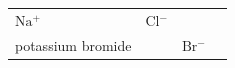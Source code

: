 \begin{enumerate}[noitemsep, label=\textbf{\arabic*}. ]
{{\begin{center}
\begin{xtabular}[t]{|l|l|l|l|}
        \begin{math}\mathrm{Na}{}^{+}\end{math} &
    
    
        \begin{math}\mathrm{Cl}{}^{-}\end{math} &
    
    
     \tabularnewline{}
    
    
        potassium bromide &
    
    
         &
    
    
        \begin{math}\mathrm{Br}{}^{-}\end{math} &
    
    
     \tabularnewline{}
    

\end{xtabular}
\end{center}}}
\end{enumerate}
